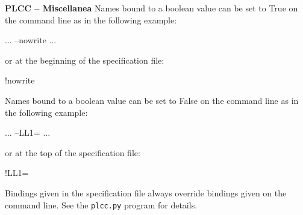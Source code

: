 \begin{minipage}[t]{\sw}
\slidenumber
\LARGE
{\bf PLCC -- Miscellanea}\exx
Names bound to a boolean value can be set to True
on the command line as in the following example:
\begin{qv}
... --nowrite ...
\end{qv}
or at the beginning of the specification file:
\begin{qv}
!nowrite
\end{qv}
Names bound to a boolean value can be set to False
on the command line as in the following example:
\begin{qv}
... --LL1= ...
\end{qv}
or at the top of the specification file:
\begin{qv}
!LL1=
\end{qv}
Bindings given in the specification file always override
bindings given on the command line.\exx
See the \verb'plcc.py' program for details.
\end{minipage}
\clearpage
